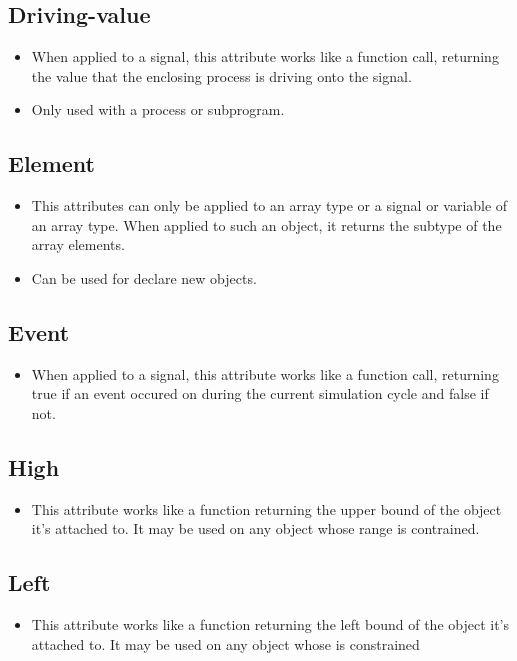 \documentclass[a4paper,12pt]{article}
\begin{document}
	\subsection*{Driving-value}
	\begin{itemize}
		\item  When applied to a signal, this attribute works like a function call, returning the value that the enclosing process is driving onto the signal.
		\item Only used with a process or subprogram.
	\end{itemize}
	
	\subsection*{Element}
	 \begin{itemize}
	 	\item This attributes can only be applied to an array type or a signal or variable of an array type. When applied to such an object, it returns the subtype of the array elements.
	 	\item Can be used for declare new objects.
	 \end{itemize}
	
	\subsection*{Event}
	\begin{itemize}
		\item When applied to a signal, this attribute works like a function call, returning true if an event occured on during the current simulation cycle and false if not.
	\end{itemize}
	
	\subsection*{High}
	\begin{itemize}
		\item This attribute works like a function returning the upper bound of the object it's attached to. It may be used on any object whose range is contrained.
	\end{itemize}
	
	\subsection*{Left}
	\begin{itemize}
		\item This attribute works like a function returning the left bound of the object it's attached to. It may be used on any object whose is constrained
	\end{itemize}
	
\end{document}
